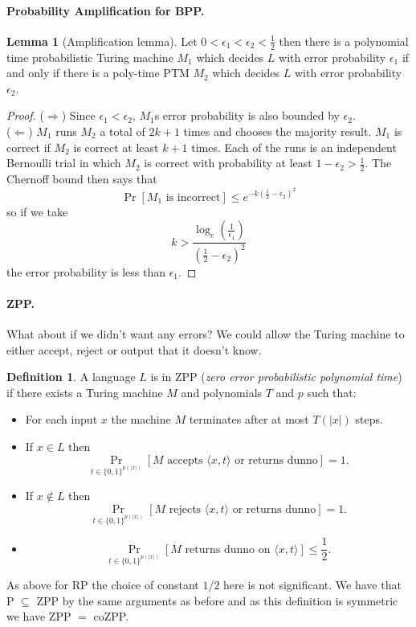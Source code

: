 \documentclass[11pt,a4paper]{article}
\theoremstyle{definition}
\newtheorem{lem}{Lemma}
\newtheorem{defn}{Definition}
\begin{document}
\paragraph{Probability Amplification for BPP.}
\begin{lem}[Amplification lemma]
Let $0< \epsilon_1 < \epsilon_2 < \frac{1}{2}$ then there is a polynomial time probabilistic Turing machine $M_1$ which decides $L$ with error probability $\epsilon_1$ if and only if there is a poly-time PTM $M_2$ which decides $L$ with error probability $\epsilon_2$.
\end{lem}
\begin{proof}
($\Rightarrow$) Since $\epsilon_1 < \epsilon_2$, $M_1$s error probability is also bounded by $\epsilon_2$.\\
($\Leftarrow$) $M_1$ runs $M_2$ a total of $2k+1$ times and chooses the majority result.
$M_1$ is correct if $M_2$ is correct at least $k+1$ times.
Each of the runs is an independent Bernoulli trial in which $M_2$ is correct with probability at least $1-\epsilon_2 >\frac{1}{2}$.
The Chernoff bound then says that
\[
\Pr[M_1 \text{ is incorrect}] \le e^{-k\left(\frac{1}{2}- \epsilon_2\right)^2}
\]
so if we take
\[
k >  \frac{\log_e\left(\frac{1}{\epsilon_1}\right)}{\left(\frac{1}{2} - \epsilon_2\right)^2}
\]
the error probability is less than $\epsilon_1$.
\end{proof}

\paragraph{ZPP.}
What about if we didn't want any errors?
We could allow the Turing machine to either accept, reject or output that it doesn't know.
\begin{defn}
A language $L$ is in ZPP (\emph{zero error probabilistic polynomial time}) if there exists a Turing machine $M$ and polynomials $T$ and $p$ such that:
\begin{itemize}
\item
For each input $x$ the machine $M$ terminates after at most $T(|x|)$ steps.
\item
If $x\in L$ then \[\Pr_{t\in \{0,1\}^{p(|x|)}}[M \text{ accepts } \langle x, t\rangle \text{ or returns dunno}] = 1.\]
\item
If $x\not\in L$ then \[\Pr_{t\in \{0,1\}^{p(|x|)}}[M \text{ rejects } \langle x, t\rangle \text{ or returns dunno}] = 1 .\]
\item
\[\Pr_{t\in \{0,1\}^{p(|x|)}}[M \text{ returns dunno on } \langle x, t\rangle] \le \frac{1}{2}.\]
\end{itemize}
\end{defn}
As above for RP the choice of constant $1/2$ here is not significant.
We have that P $\subseteq$ ZPP by the same arguments as before and as this definition is symmetric we have ZPP $=$ coZPP.
\end{document}
